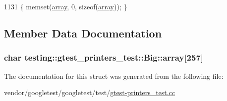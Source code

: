 \begin{DoxyCode}
1131 \{ memset(\hyperlink{structtesting_1_1gtest__printers__test_1_1Big_a863911a8ec5c3bbe79c44d399f1de61f}{array}, 0, \textcolor{keyword}{sizeof}(\hyperlink{structtesting_1_1gtest__printers__test_1_1Big_a863911a8ec5c3bbe79c44d399f1de61f}{array})); \}
\end{DoxyCode}


\subsection{Member Data Documentation}
\subsubsection[{\texorpdfstring{array}{array}}]{\setlength{\rightskip}{0pt plus 5cm}char testing\+::gtest\+\_\+printers\+\_\+test\+::\+Big\+::array\mbox{[}257\mbox{]}}\hypertarget{structtesting_1_1gtest__printers__test_1_1Big_a863911a8ec5c3bbe79c44d399f1de61f}{}\label{structtesting_1_1gtest__printers__test_1_1Big_a863911a8ec5c3bbe79c44d399f1de61f}


The documentation for this struct was generated from the following file\+:\begin{DoxyCompactItemize}
\item 
vendor/googletest/googletest/test/\hyperlink{gtest-printers__test_8cc}{gtest-\/printers\+\_\+test.\+cc}\end{DoxyCompactItemize}
